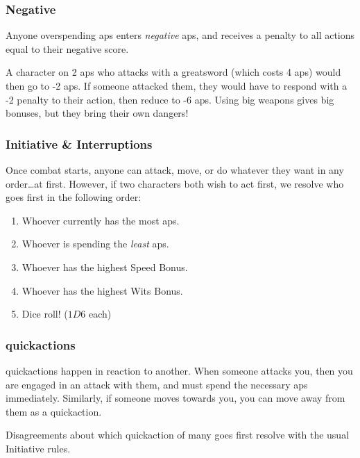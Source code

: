 \begin{multicols}{2}
\subsubsection{Negative }
Anyone overspending \glspl{ap} enters \emph{negative} \glspl{ap}, and receives a penalty to all actions equal to their negative score.

\begin{exampletext}
  A character on 2 \glspl{ap} who attacks with a greatsword (which costs 4 \glspl{ap}) would then go to -2 \glspl{ap}.
  If someone attacked them, they would have to respond with a -2 penalty to their action, then reduce to -6 \glspl{ap}.
  Using big weapons gives big bonuses, but they bring their own dangers!
\end{exampletext}

\subsubsection{Initiative \& Interruptions}

Once combat starts, anyone can attack, move, or do whatever they want in any order\ldots at first.
However, if two characters both wish to act first, we resolve who goes first in the following order:

\begin{enumerate}
  \item
  Whoever currently has the most \glspl{ap}.
  \item
  Whoever is spending the \emph{least} \glspl{ap}.
  \item
  Whoever has the highest Speed Bonus.
  \item
  Whoever has the highest Wits Bonus.
  \item
  Dice roll! ($1D6$ each)
\end{enumerate}

\subsubsection{\Glspl{quickaction}}

\Glspl{quickaction} happen in reaction to another.
When someone attacks you, then you are engaged in an attack with them, and must spend the necessary \glspl{ap} immediately.
Similarly, if someone moves towards you, you can move away from them as a \gls{quickaction}.

Disagreements about which \gls{quickaction} of many goes first resolve with the usual Initiative rules.


\end{multicols}
